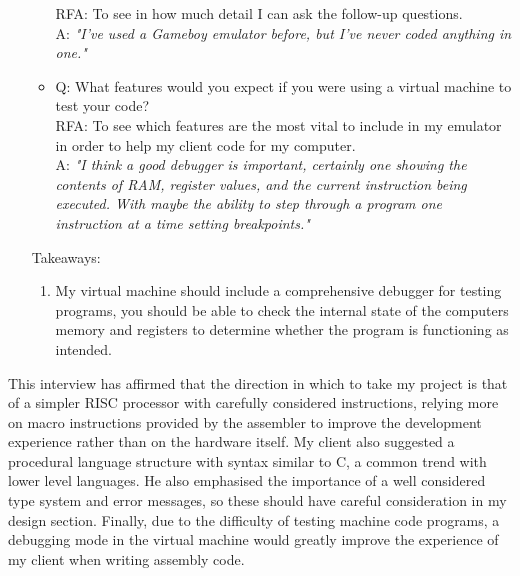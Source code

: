 \begin{enumerate}
\begin{itemize}
                RFA: To see in how much detail I can ask the follow-up questions.\\
                A: \textit{"I've used a Gameboy emulator before, but I've never coded anything in one."}
            \item Q: What features would you expect if you were using a virtual machine to test your code? \\
                RFA: To see which features are the most vital to include in my emulator in order to help my client code for my computer.\\
                A: \textit{"I think a good debugger is important, certainly one showing the contents of RAM, register values, and the current instruction being executed. With maybe the ability to step through a program one instruction at a time setting breakpoints."}
        \end{itemize}
        Takeaways:
        \begin{enumerate}
            \item My virtual machine should include a comprehensive debugger for testing programs, you should be able to check the internal state of the computers memory and registers to determine whether the program is functioning as intended.
        \end{enumerate}
\end{enumerate}

This interview has affirmed that the direction in which to take my project is that of a simpler RISC processor with carefully considered instructions, relying more on macro instructions provided by the assembler to improve the development experience rather than on the hardware itself. My client also suggested a procedural language structure with syntax similar to C, a common trend with lower level languages. He also emphasised the importance of a well considered type system and error messages, so these should have careful consideration in my design section. Finally, due to the difficulty of testing machine code programs, a debugging mode in the virtual machine would greatly improve the experience of my client when writing assembly code.